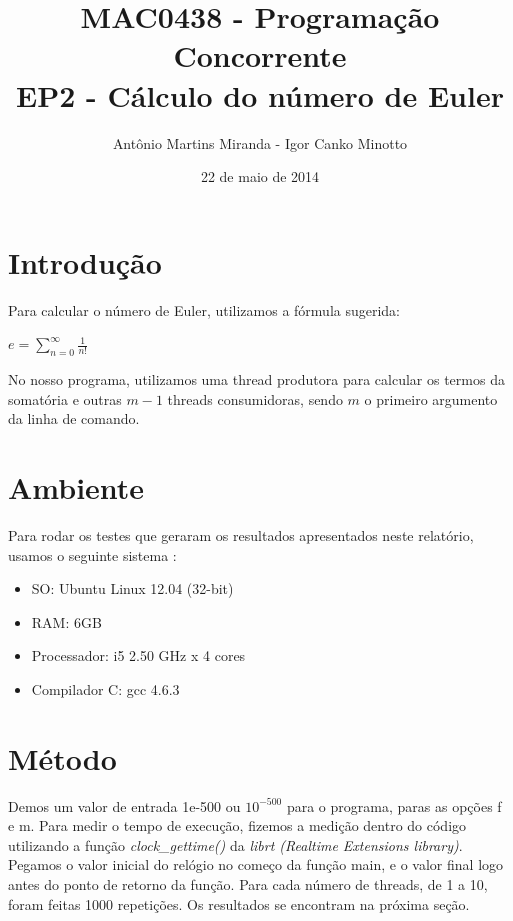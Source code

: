 \documentclass[a4paper,11pt]{article} %
\title{
	\vspace{0 mm}
	\huge{\textbf{MAC0438 - Programação Concorrente}} \\
	\vspace{3 mm}
	\huge{EP2 - Cálculo do número de Euler}
	\vspace{0 mm}
}
\author	{
	\Large{{ Antônio Martins Miranda - Igor Canko Minotto}}	\\
}
\date{\Large{{ 22 de maio de 2014}}}
\begin{document}
\maketitle

\pagebreak 
\tableofcontents

\pagebreak
\setcounter{section}{-1}

\section{Introdução}
  Para calcular o número de Euler, utilizamos a fórmula sugerida: \linebreak 
  \centerline{ $e =\sum\limits_{n=0}^\infty \frac{1}{n!}$ } 
\indent No nosso programa, utilizamos uma thread produtora para calcular os termos da somatória e outras $m-1$ threads consumidoras, sendo $m$ o primeiro argumento da linha de comando. 
  
\section{Ambiente}
  Para rodar os testes que geraram os resultados apresentados neste relatório, usamos o seguinte sistema :
\begin{itemize}
\item SO: Ubuntu Linux 12.04 (32-bit)
\item RAM: 6GB
\item Processador: i5 2.50 GHz x 4 cores
\item Compilador C: gcc 4.6.3
\end{itemize}

\section{Método}
  Demos um valor de entrada 1e-500 ou $10^{-500}$ para o programa, paras as opções f e m. Para medir o tempo de execução,
fizemos a medição dentro do código utilizando a função \textit{clock\_gettime()} da \textit{librt (Realtime Extensions library)}.
Pegamos o valor inicial do relógio no começo da função main, e o valor final logo antes do ponto de retorno da função.
Para cada número de threads, de 1 a 10, foram feitas 1000 repetições. Os resultados se encontram na próxima seção.

\pagebreak
\end{document}
